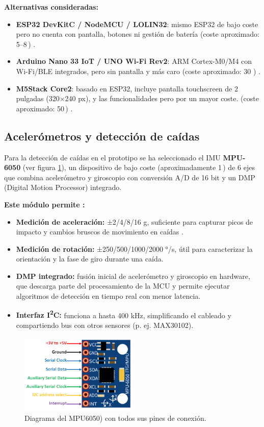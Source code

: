 \documentclass[12pt, a4paper]{article}
\begin{document}
	\noindent\textbf{Alternativas consideradas:}
	\begin{itemize}
		\item \textbf{ESP32 DevKitC / NodeMCU / LOLIN32}: mismo ESP32 de bajo coste pero no cuenta con pantalla, botones ni gestión de batería (coste aproximado: 5–8\,\texteuro{}) \cite{ESP32DevKitC2018}.
		\item \textbf{Arduino Nano 33 IoT / UNO Wi-Fi Rev2}: ARM Cortex-M0/M4 con Wi-Fi/BLE integrados, pero sin pantalla y más caro (coste aproximado: 30 \texteuro{}) \cite{ArduinoNano33IoT2019}.
		\item \textbf{M5Stack Core2}: basado en ESP32, incluye pantalla touchscreen de 2 pulgadas (320×240 px), y las funcionalidades pero por un mayor coste. (coste aproximado: 50\,\texteuro{}) \cite{M5StackCore22020}.
	\end{itemize}
	
	
	\subsection{Acelerómetros y detección de caídas}
	
	Para la detección de caídas en el prototipo se ha seleccionado el IMU \textbf{MPU-6050} (ver figura \ref{fig:mpu}), un dispositivo de bajo coste (aproximadamente 1\,\texteuro{}) de 6 ejes que combina acelerómetro y giroscopio con conversión A/D de 16 bit y un DMP (Digital Motion Processor) integrado. 	
	
	\noindent\textbf{Este módulo permite \cite{MPU6050Datasheet}:}
	\begin{itemize}
		\item \textbf{Medición de aceleración:} ±2/4/8/16 g, suficiente para capturar picos de impacto y cambios bruscos de movimiento en caídas .
		\item \textbf{Medición de rotación:} ±250/500/1000/2000 °/s, útil para caracterizar la orientación y la fase de giro durante una caída.
		\item \textbf{DMP integrado:} fusión inicial de acelerómetro y giroscopio en hardware, que descarga parte del procesamiento de la MCU y permite ejecutar algoritmos de detección en tiempo real con menor latencia.
		\item \textbf{Interfaz I\textsuperscript{2}C:} funciona a hasta 400 kHz, simplificando el cableado y compartiendo bus con otros sensores (p. ej. MAX30102).
	\end{itemize}
	
	\begin{figure}[htbp]
		\centering
		\includegraphics[width=0.5\textwidth]{images/MPU6050.png}
		\caption[Diagrama de pines del MPU6050]{Diagrama del  \mbox{MPU6050)} con todos sus pines de conexión.}
		\label{fig:mpu}
	\end{figure}
	
\end{document}
